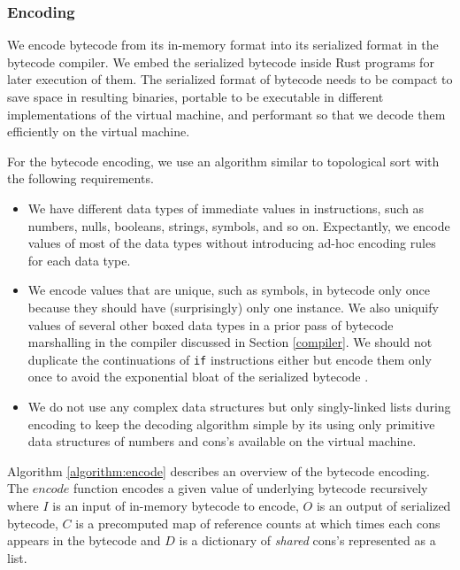 \documentclass[sigplan, anonymous, review]{acmart}
\begin{document}
\subsubsection{Encoding} \label{encoding}

We encode bytecode from its in-memory format into its serialized format in the
bytecode compiler.
We embed the serialized bytecode inside Rust programs for later
execution of them.
The serialized format of bytecode needs to be compact to save space in
resulting binaries, portable to be executable in different
implementations of the virtual machine, and performant so that we
decode them efficiently on the virtual machine.

For the bytecode encoding, we use an algorithm similar to topological
sort \cite{topologicalsort} with the following requirements.

\begin{itemize}
  \item We have different data types of immediate values in instructions,
    such as numbers, nulls, booleans, strings, symbols, and so on.
    Expectantly, we encode values of most of the data types without
    introducing ad-hoc encoding rules for each data type.
  \item We encode values that are unique, such as symbols, in
    bytecode only once
    because they should have (surprisingly) only one instance.
    We also uniquify values of several other boxed data
    types in a prior pass of bytecode marshalling in the
    compiler discussed in Section \ref{compiler}.
    We should not duplicate the continuations of \texttt{if}
    instructions either but encode them only once to avoid the exponential bloat
    of the serialized bytecode \cite{ribbit7kb2023}.
  \item We do not use any complex data structures but only singly-linked lists
    during encoding to keep the decoding algorithm simple by its using
    only primitive data structures of numbers and cons's available on
    the virtual machine.
\end{itemize}

Algorithm \ref{algorithm:encode} describes an overview of the bytecode
encoding.
The $encode$ function encodes a given value of
underlying bytecode recursively where $I$ is an input of in-memory
bytecode to encode,
$O$ is an output of serialized bytecode, $C$ is a precomputed map of
reference counts
at which times each cons appears in the bytecode and $D$ is a
dictionary of \textit{shared} cons's represented as a list.
\end{document}

